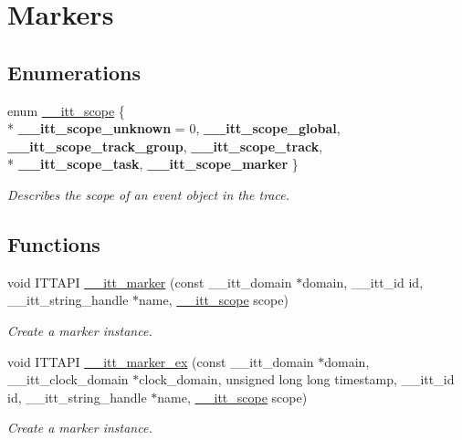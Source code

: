 \hypertarget{group__markers}{}\section{Markers}
\label{group__markers}
\subsection*{Enumerations}
\begin{DoxyCompactItemize}
\item 
\hypertarget{group__markers_ga9712c6a992a435d4d134e7164f609f04}{}enum \hyperlink{group__markers_ga9712c6a992a435d4d134e7164f609f04}{\+\_\+\+\_\+itt\+\_\+scope} \{ \\*
{\bfseries \+\_\+\+\_\+itt\+\_\+scope\+\_\+unknown} = 0, 
{\bfseries \+\_\+\+\_\+itt\+\_\+scope\+\_\+global}, 
{\bfseries \+\_\+\+\_\+itt\+\_\+scope\+\_\+track\+\_\+group}, 
{\bfseries \+\_\+\+\_\+itt\+\_\+scope\+\_\+track}, 
\\*
{\bfseries \+\_\+\+\_\+itt\+\_\+scope\+\_\+task}, 
{\bfseries \+\_\+\+\_\+itt\+\_\+scope\+\_\+marker}
 \}\label{group__markers_ga9712c6a992a435d4d134e7164f609f04}
\begin{DoxyCompactList}\small\item\em Describes the scope of an event object in the trace. \end{DoxyCompactList}
\end{DoxyCompactItemize}
\subsection*{Functions}
\begin{DoxyCompactItemize}
\item 
void I\+T\+T\+A\+P\+I \hyperlink{group__markers_gaf5bb17e236d525fa8a84d66d62259503}{\+\_\+\+\_\+itt\+\_\+marker} (const \+\_\+\+\_\+itt\+\_\+domain $\ast$domain, \+\_\+\+\_\+itt\+\_\+id id, \+\_\+\+\_\+itt\+\_\+string\+\_\+handle $\ast$name, \hyperlink{group__markers_ga9712c6a992a435d4d134e7164f609f04}{\+\_\+\+\_\+itt\+\_\+scope} scope)
\begin{DoxyCompactList}\small\item\em Create a marker instance. \end{DoxyCompactList}\item 
void I\+T\+T\+A\+P\+I \hyperlink{group__markers_gad4d64549f975be3321d5bf6e7666311e}{\+\_\+\+\_\+itt\+\_\+marker\+\_\+ex} (const \+\_\+\+\_\+itt\+\_\+domain $\ast$domain, \+\_\+\+\_\+itt\+\_\+clock\+\_\+domain $\ast$clock\+\_\+domain, unsigned long long timestamp, \+\_\+\+\_\+itt\+\_\+id id, \+\_\+\+\_\+itt\+\_\+string\+\_\+handle $\ast$name, \hyperlink{group__markers_ga9712c6a992a435d4d134e7164f609f04}{\+\_\+\+\_\+itt\+\_\+scope} scope)
\begin{DoxyCompactList}\small\item\em Create a marker instance. \end{DoxyCompactList}\end{DoxyCompactItemize}


